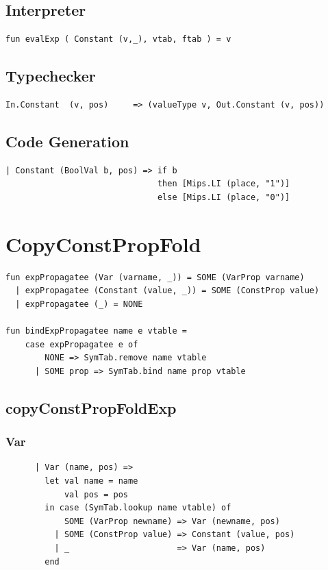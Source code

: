 \documentclass[11pt]{article}
\begin{document}
    \subsection{Interpreter}
    \begin{lstlisting}
fun evalExp ( Constant (v,_), vtab, ftab ) = v
    \end{lstlisting}

    \subsection{Typechecker}
    \begin{lstlisting}
In.Constant  (v, pos)     => (valueType v, Out.Constant (v, pos))
    \end{lstlisting}

    \subsection{Code Generation}
    \begin{lstlisting}
| Constant (BoolVal b, pos) => if b
                               then [Mips.LI (place, "1")]
                               else [Mips.LI (place, "0")]
    \end{lstlisting}

	\newpage
	\section{CopyConstPropFold} \label{CopyConstPropFold}
	\begin{lstlisting}
fun expPropagatee (Var (varname, _)) = SOME (VarProp varname)
  | expPropagatee (Constant (value, _)) = SOME (ConstProp value)
  | expPropagatee (_) = NONE

fun bindExpPropagatee name e vtable =
    case expPropagatee e of
        NONE => SymTab.remove name vtable
      | SOME prop => SymTab.bind name prop vtable
	\end{lstlisting}
	\subsection{copyConstPropFoldExp} \label{copyConstPropFoldExp}
	\subsubsection{Var} \label{ccpfvar}
	\begin{lstlisting}
      | Var (name, pos) =>
        let val name = name
            val pos = pos
        in case (SymTab.lookup name vtable) of
            SOME (VarProp newname) => Var (newname, pos)
          | SOME (ConstProp value) => Constant (value, pos)
          | _                      => Var (name, pos)
        end
    \end{lstlisting}
\end{document}
